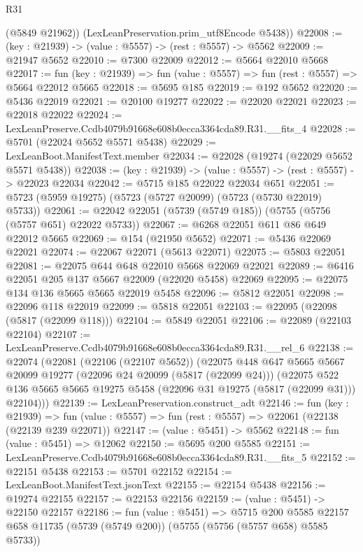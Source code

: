 \begin{lexlean}{R31}
\begin{coremodule}
        (@5849 @21962))
      (LexLeanPreservation.prim_utf8Encode @5438))
@22008 := (key : @21939) -> (value : @5557) -> (rest : @5557) -> @5562
@22009 := @21947 @5652
@22010 := @7300 @22009
@22012 := @5664 @22010 @5668
@22017 := fun (key : @21939) => fun (value : @5557) => fun (rest : @5557) => @5664 @22012 @5665
@22018 := @5695 @185
@22019 := @192 @5652
@22020 := @5436 @22019
@22021 := @20100 @19277
@22022 := @22020 @22021
@22023 := @22018 @22022
@22024 := LexLeanPreserve.Ccdb4079b91668e608b0ecca3364cda89.R31.__fits_4
@22028 := @5701 (@22024 @5652 @5571 @5438)
@22029 := LexLeanBoot.ManifestText.member
@22034 := @22028 (@19274 (@22029 @5652 @5571 @5438))
@22038 := (key : @21939) -> (value : @5557) -> (rest : @5557) -> @22023 @22034
@22042 := @5715 @185 @22022 @22034 @651
@22051 := @5723 (@5959 @19275) (@5723 (@5727 @20099) (@5723 (@5730 @22019) @5733))
@22061 := @22042 @22051 (@5739 (@5749 @185)) (@5755 (@5756 (@5757 @651) @22022 @5733))
@22067 := @6268 @22051 @611 @86 @649 @22012 @5665
@22069 := @154 (@21950 @5652)
@22071 := @5436 @22069 @22021
@22074 := @22067 @22071 (@5613 @22071)
@22075 := @5803 @22051
@22081 := @22075 @644 @648 @22010 @5668 @22069 @22021
@22089 := @6416 @22051 @205 @137 @5667 @22009 (@22020 @5458) @22069
@22095 := @22075 @134 @136 @5665 @5665 @22019 @5458
@22096 := @5812 @22051
@22098 := @22096 @118 @22019
@22099 := @5818 @22051
@22103 := @22095 (@22098 (@5817 (@22099 @118)))
@22104 := @5849 @22051
@22106 := @22089 (@22103 @22104)
@22107 := LexLeanPreserve.Ccdb4079b91668e608b0ecca3364cda89.R31.__rel_6
@22138 := @22074
    (@22081
      (@22106 (@22107 @5652))
      (@22075
        @448
        @647
        @5665
        @5667
        @20099
        @19277
        (@22096 @24 @20099 (@5817 (@22099 @24)))
        (@22075
          @522
          @136
          @5665
          @5665
          @19275
          @5458
          (@22096 @31 @19275 (@5817 (@22099 @31)))
          @22104)))
@22139 := LexLeanPreservation.construct_adt
@22146 := fun (key : @21939) =>
  fun (value : @5557) => fun (rest : @5557) => @22061 (@22138 (@22139 @239 @22071))
@22147 := (value : @5451) -> @5562
@22148 := fun (value : @5451) => @12062
@22150 := @5695 @200 @5585
@22151 := LexLeanPreserve.Ccdb4079b91668e608b0ecca3364cda89.R31.__fits_5
@22152 := @22151 @5438
@22153 := @5701 @22152
@22154 := LexLeanBoot.ManifestText.jsonText
@22155 := @22154 @5438
@22156 := @19274 @22155
@22157 := @22153 @22156
@22159 := (value : @5451) -> @22150 @22157
@22186 := fun (value : @5451) =>
  @5715
    @200
    @5585
    @22157
    @658
    @11735
    (@5739 (@5749 @200))
    (@5755 (@5756 (@5757 @658) @5585 @5733))

\end{coremodule}
\end{lexlean}
